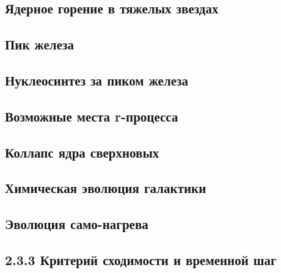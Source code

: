 \documentclass[%
master,    %
natbib,      %
subf,        %
href,        %
colorlinks,  %
]{disser}
\begin{document}
\subsection{Ядерное горение в тяжелых звездах}
\subsection{Пик железа}
\subsection{Нуклеосинтез за пиком железа}
\subsection{Возможные места r-процесса}
\subsection{Коллапс ядра сверхновых}
\subsection{Химическая эволюция галактики}
\subsection{Эволюция само-нагрева}
\subsection{2.3.3 Критерий сходимости и временной шаг}
\end{document}
